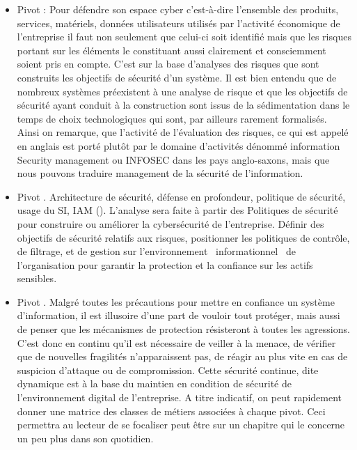 \begin{itemize}
\item Pivot  : Pour défendre son espace cyber  c'est-à-dire l'ensemble des produits, services, matériels, données utilisateurs utilisés par l'activité  économique de l'entreprise il faut non seulement que celui-ci soit identifié mais que les risques portant sur les éléments le constituant aussi clairement et consciemment soient pris en compte. C'est sur la base d'analyses des risques que sont construits les objectifs de sécurité d'un système. Il est bien entendu que de nombreux systèmes préexistent à une analyse de risque et que les objectifs de sécurité ayant conduit à la construction sont issus de  la sédimentation dans le temps de choix technologiques qui sont, par ailleurs rarement formalisés. Ainsi on remarque, que l'activité de l'évaluation des risques, ce qui est appelé en anglais  est porté plutôt par le domaine d'activités dénommé  information Security management  ou INFOSEC dans les pays anglo-saxons, mais que nous pouvons traduire  management de la sécurité de l'information.
\item Pivot  . Architecture de sécurité, défense en profondeur, politique de sécurité, usage du SI, IAM (). L'analyse sera faite à partir des Politiques de sécurité pour construire ou améliorer la cybersécurité de l'entreprise. Définir des objectifs de sécurité relatifs aux risques,  positionner les politiques de contrôle, de filtrage, et de gestion sur l'environnement  informationnel  de  l'organisation pour garantir la protection et la confiance sur les actifs sensibles. 
\item  Pivot  . Malgré toutes les précautions pour mettre en confiance un système d'information, il est illusoire d'une part de vouloir tout protéger, mais aussi de penser que les mécanismes de  protection résisteront à toutes les agressions. C'est donc en continu qu'il est nécessaire de veiller à la menace, de vérifier que de nouvelles fragilités n'apparaissent pas, de réagir au plus vite en cas de suspicion d'attaque ou de compromission.  Cette sécurité continue, dite dynamique est à la base du maintien en condition de sécurité de l'environnement digital de l'entreprise. 
A titre indicatif, on peut rapidement donner une matrice des classes de métiers associées à chaque pivot. Ceci permettra au lecteur de se focaliser peut être sur un chapitre qui le concerne un peu plus dans son quotidien.
\end{itemize}

